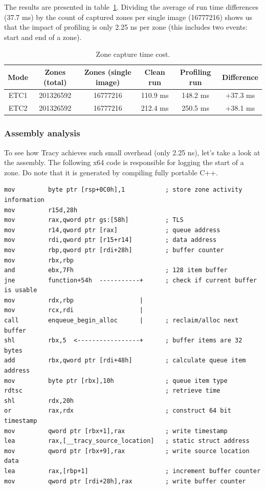 \documentclass[hidelinks,titlepage,a4paper]{article}
\begin{document}
The results are presented in table~\ref{PerformanceImpact}. Dividing the average of run time differences (37.7 \si{\milli\second}) by the count of captured zones per single image (\num{16777216}) shows us that the impact of profiling is only 2.25 \si{\nano\second} per zone (this includes two events: start and end of a zone).

\begin{table}[h]
\centering
\begin{tabular}[h]{c|c|c|c|c|c}
\textbf{Mode} & \textbf{Zones (total)} & \textbf{Zones (single image)} & \textbf{Clean run} & \textbf{Profiling run} & \textbf{Difference} \\ \hline
ETC1 & \num{201326592} & \num{16777216} & 110.9 \si{\milli\second} & 148.2 \si{\milli\second} & +37.3 \si{\milli\second} \\
ETC2 & \num{201326592} & \num{16777216} & 212.4 \si{\milli\second} & 250.5 \si{\milli\second} & +38.1 \si{\milli\second}
\end{tabular}
\caption{Zone capture time cost.}
\label{PerformanceImpact}
\end{table}

\subsubsection{Assembly analysis}

To see how Tracy achieves such small overhead (only 2.25 \si{\nano\second}), let's take a look at the assembly. The following x64 code is responsible for logging the start of a zone. Do note that it is generated by compiling fully portable C++.

\begin{lstlisting}[language={[x86masm]Assembler}]
mov         byte ptr [rsp+0C0h],1           ; store zone activity information
mov         r15d,28h
mov         rax,qword ptr gs:[58h]          ; TLS
mov         r14,qword ptr [rax]             ; queue address
mov         rdi,qword ptr [r15+r14]         ; data address
mov         rbp,qword ptr [rdi+28h]         ; buffer counter
mov         rbx,rbp
and         ebx,7Fh                         ; 128 item buffer
jne         function+54h  -----------+      ; check if current buffer is usable
mov         rdx,rbp                  |
mov         rcx,rdi                  |
call        enqueue_begin_alloc      |      ; reclaim/alloc next buffer
shl         rbx,5  <-----------------+      ; buffer items are 32 bytes
add         rbx,qword ptr [rdi+48h]         ; calculate queue item address
mov         byte ptr [rbx],10h              ; queue item type
rdtsc                                       ; retrieve time
shl         rdx,20h
or          rax,rdx                         ; construct 64 bit timestamp
mov         qword ptr [rbx+1],rax           ; write timestamp
lea         rax,[__tracy_source_location]   ; static struct address
mov         qword ptr [rbx+9],rax           ; write source location data
lea         rax,[rbp+1]                     ; increment buffer counter
mov         qword ptr [rdi+28h],rax         ; write buffer counter
\end{lstlisting}
\end{document}

